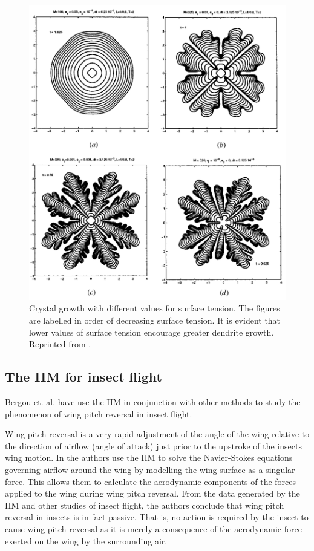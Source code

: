 \begin{figure}[h]
    \centering
    \includegraphics{diagrams/CrystalDiagram.png}
    \caption{Crystal growth with different values for surface tension. The figures are labelled in order of decreasing surface tension. It is evident that lower values of surface tension encourage greater dendrite growth. Reprinted from \cite{lisoni99}.}
    \label{CrystalDiagram}
\end{figure}

\newpage 
\subsection{The IIM for insect flight}

Bergou et. al. \cite{bergouetal07} have use the IIM in conjunction with other methods to study the phenomenon of wing pitch reversal in insect flight.

Wing pitch reversal is a very rapid adjustment of the angle of the wing relative to the direction of airflow (angle of attack) just prior to the upstroke of the insects wing motion.
In \cite{bergouetal07} the authors use the IIM to solve the Navier-Stokes equations governing airflow around the wing by modelling the wing surface as a singular force.
This allows them to calculate the aerodynamic components of the forces applied to the wing during wing pitch reversal.
From the data generated by the IIM and other studies of insect flight, the authors conclude that wing pitch reversal in insects is in fact passive.
That is, no action is required by the insect to cause wing pitch reversal as it is merely a consequence of the aerodynamic force exerted on the wing by the surrounding air.

